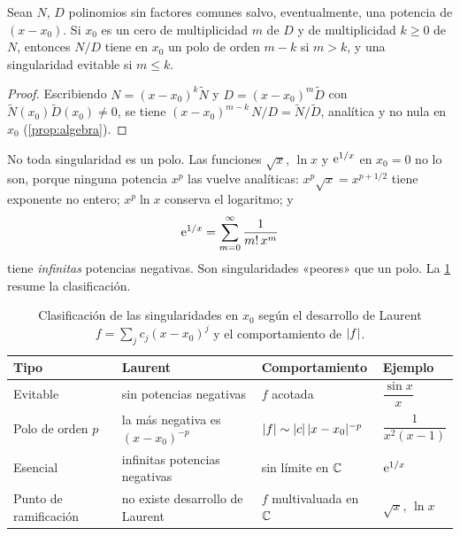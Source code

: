 \begin{proposicion}\label{prop:regla}
Sean $N$, $D$ polinomios sin factores comunes salvo, eventualmente, una
potencia de $(x-x_0)$. Si $x_0$ es un cero de multiplicidad $m$ de $D$ y de
multiplicidad $k\ge0$ de $N$, entonces $N/D$ tiene en $x_0$ un polo de orden
$m-k$ si $m>k$, y una singularidad evitable si $m\le k$.
\end{proposicion}

\begin{proof}
Escribiendo $N=(x-x_0)^{k}\tilde N$ y $D=(x-x_0)^{m}\tilde D$ con
$\tilde N(x_0)\tilde D(x_0)\neq0$, se tiene
$(x-x_0)^{m-k}\,N/D=\tilde N/\tilde D$, analítica y no nula en $x_0$
(\cref{prop:algebra}).
\end{proof}

No toda singularidad es un polo. Las funciones $\sqrt{x}$, $\ln x$ y
$\mathrm{e}^{1/x}$ en $x_0=0$ no lo son, porque ninguna potencia $x^{p}$ las vuelve
analíticas: $x^{p}\sqrt{x}=x^{p+1/2}$ tiene exponente no entero; $x^{p}\ln x$
conserva el logaritmo; y
\[
  \mathrm{e}^{1/x}=\sum_{m=0}^{\infty}\frac{1}{m!\,x^{m}}
\]
tiene \emph{infinitas} potencias negativas. Son singularidades «peores» que
un polo. La \cref{tab:singularidades} resume la clasificación.

\begin{table}[ht]
\centering
\caption{Clasificación de las singularidades en $x_0$ según el desarrollo de
Laurent $f=\sum_{j}c_j(x-x_0)^{j}$ y el comportamiento de $\lvert f\rvert$.}
\label{tab:singularidades}
\renewcommand{\arraystretch}{1.4}
\small
\begin{tabular}{@{}l l l l@{}}
\toprule
\textcolor{cian}{\bfseries Tipo} & \textcolor{cian}{\bfseries Laurent} &
\textcolor{cian}{\bfseries Comportamiento} & \textcolor{cian}{\bfseries Ejemplo}\\
\midrule
Evitable              & sin potencias negativas            & $f$ acotada               & $\dfrac{\sin x}{x}$\\[4pt]
Polo de orden $p$     & la más negativa es $(x-x_0)^{-p}$  & $\lvert f\rvert\sim\lvert c\rvert\,\lvert x-x_0\rvert^{-p}$ & $\dfrac{1}{x^{2}(x-1)}$\\[4pt]
Esencial              & infinitas potencias negativas      & sin límite en $\mathbb{C}$        & $\mathrm{e}^{1/x}$\\[4pt]
Punto de ramificación & no existe desarrollo de Laurent    & $f$ multivaluada en $\mathbb{C}$  & $\sqrt{x}$, $\ln x$\\
\bottomrule
\end{tabular}
\end{table}

